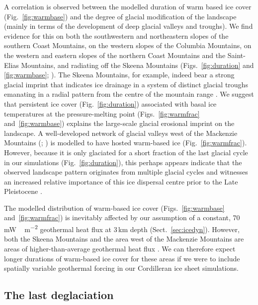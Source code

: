 \documentclass[tc]{copernicus}
\begin{document}
A correlation is observed between the modelled duration of warm based ice cover
(Fig.~\ref{fig:warmbase}) and the degree of glacial modification of the
landscape (mainly in terms of the development of deep glacial valleys and
troughs). We find evidence for this on both the southwestern and northeastern
slopes of the southern Coast Mountains, on the western slopes of the Columbia
Mountains, on the western and eastern slopes of the northern Coast Mountains
and the Saint-Elias Mountains, and radiating off the Skeena Mountains
(Figs.~\ref{fig:duration} and \ref{fig:warmbase};
\citealp[Fig.~2]{Kleman.etal.2010}).
The Skeena Mountains, for example, indeed bear a strong glacial imprint that
indicates ice drainage in a system of distinct glacial troughs emanating in a
radial pattern from the centre of the mountain range
\citep[Fig.~2]{Kleman.etal.2010}. We suggest that
persistent ice cover (Fig.~\ref{fig:duration}) associated with basal ice
temperatures at the pressure-melting point (Figs.~\ref{fig:warmfrac}
and~\ref{fig:warmbase}) explains the large-scale glacial erosional imprint on
the landscape. A well-developed network of glacial valleys west of
the Mackenzie Mountains (\citealp[Fig.~2]{Kleman.etal.2010}; \citealp[Fig.~8]
{Stroeven.etal.2010}) is modelled to have hosted warm-based ice
(Fig.~\ref{fig:warmfrac}). However, because it is only glaciated for a
short fraction of the last glacial cycle in our simulations
(Fig.~\ref{fig:duration}), this perhaps appears indicate that
the observed landscape pattern originates from multiple glacial cycles and
witnesses an increased relative importance of this ice dispersal centre prior
to the Late Pleistocene \citep[cf.][]{Ward.etal.2008, Demuro.etal.2012}.

The modelled distribution of warm-based ice cover (Figs.~\ref{fig:warmbase}
and~\ref{fig:warmfrac}) is inevitably affected by our assumption of a constant,
70\,\unit{mW\,m^{-2}} geothermal heat flux at 3\,km depth
(Sect.~\ref{sec:icedyn}). However, both the Skeena Mountains and the area
west of the Mackenzie Mountains are areas of higher-than-average geothermal
heat flux \citep{Blackwell.Richards.2004}. We can therefore expect longer
durations of warm-based ice cover for these areas if we were to include
spatially variable geothermal forcing in our Cordilleran ice sheet simulations.


\subsection{The last deglaciation}
\end{document}
